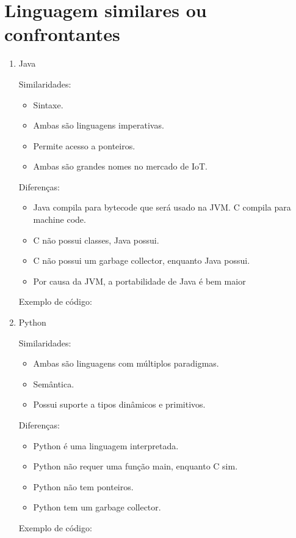 \chapter{Linguagem similares ou confrontantes}


\begin{enumerate}
    \item Java
  
    Similaridades: 
        \begin{itemize}
            \item Sintaxe.
            \item Ambas são linguagens imperativas.
            \item Permite acesso a ponteiros.
            \item Ambas são grandes nomes no mercado de IoT.
        \end{itemize}
    Diferenças:
    \begin{itemize}
        \item Java compila para bytecode que será usado na JVM. C compila para machine code.
        \item C não possui classes, Java possui.
        \item C não possui um garbage collector, enquanto Java possui.
        \item Por causa da JVM, a portabilidade de Java é bem maior
    \end{itemize}
    Exemplo de código: 
    


    \item Python
        
    Similaridades: 
        \begin{itemize}
            \item Ambas são linguagens com múltiplos paradigmas.
            \item Semântica.
            \item Possui suporte a tipos dinâmicos e primitivos.
        \end{itemize}
    Diferenças:
        \begin{itemize}
            \item Python é uma linguagem interpretada.
            \item Python não requer uma função main, enquanto C sim.
            \item Python não tem ponteiros.
            \item Python tem um garbage collector.
        \end{itemize}
    Exemplo de código: 
    
        

\end{enumerate}
